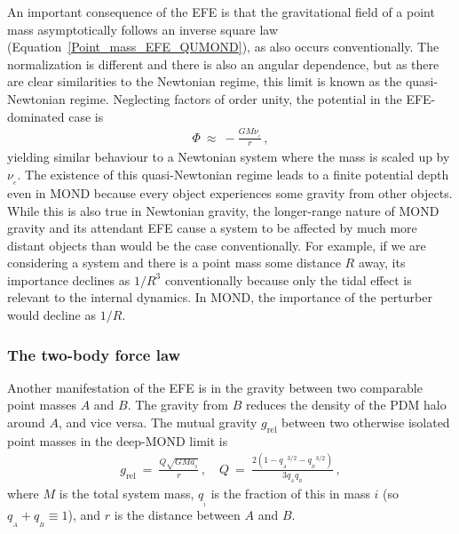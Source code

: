 \documentclass[fleqn,usenatbib,useAMS,onecolumn]{mnras} %
\begin{document}
An important consequence of the EFE is that the gravitational field of a point mass asymptotically follows an inverse square law (Equation~\ref{Point_mass_EFE_QUMOND}), as also occurs conventionally. The normalization is different and there is also an angular dependence, but as there are clear similarities to the Newtonian regime, this limit is known as the quasi-Newtonian regime. Neglecting factors of order unity, the potential in the EFE-dominated case is
\begin{eqnarray}
	\Phi ~\approx~ -\frac{GM\nu_{_e}}{r} \, ,
\end{eqnarray}
yielding similar behaviour to a Newtonian system where the mass is scaled up by $\nu_{_e}$. The existence of this quasi-Newtonian regime leads to a finite potential depth even in MOND because every object experiences some gravity from other objects. While this is also true in Newtonian gravity, the longer-range nature of MOND gravity and its attendant EFE cause a system to be affected by much more distant objects than would be the case conventionally. For example, if we are considering a system and there is a point mass some distance $R$ away, its importance declines as $1/R^3$ conventionally because only the tidal effect is relevant to the internal dynamics. In MOND, the importance of the perturber would decline as $1/R$.


\subsubsection{The two-body force law}
\label{Two_body_force}

Another manifestation of the EFE is in the gravity between two comparable point masses $A$ and $B$. The gravity from $B$ reduces the density of the PDM halo around $A$, and vice versa. The mutual gravity $g_\text{rel}$ between two otherwise isolated point masses in the deep-MOND limit is \citep{Zhao_2010_two_body}
\begin{eqnarray}
	g_\text{rel} ~=~ \frac{Q\sqrt{GMa_{_0}}}{r} \, , \quad Q ~=~ \frac{2 \left( 1 - {q_{_A}}^{3/2} - {q_{_B}}^{3/2} \right)}{3 q_{_A} q_{_B}} \, ,
	\label{Two_body_force_law_DML}
\end{eqnarray}
where $M$ is the total system mass, $q_{_i}$ is the fraction of this in mass $i$ (so $q_{_A} + q_{_B} \equiv 1$), and $r$ is the distance between $A$ and $B$.
\end{document}
